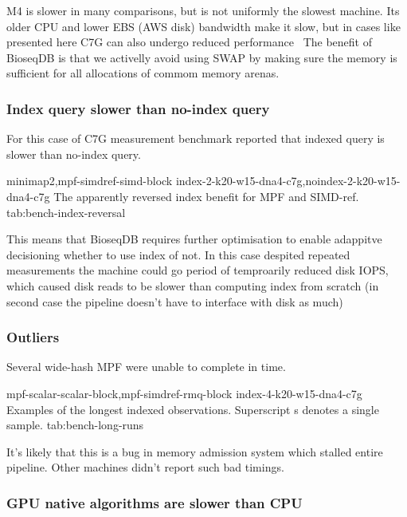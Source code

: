 M4 is slower in many comparisons, but is not uniformly the slowest machine.
Its older CPU and lower EBS (AWS disk) bandwidth make it slow, but in cases like presented here C7G can also undergo reduced performance~\autocite{aws_ebs_limits}
The benefit of BioseqDB is that we activelly avoid using SWAP by making sure the memory is sufficient for all allocations of commom memory arenas.

\subsubsection{Index query slower than no-index query}
\label{sec:bench-index-reversal}

For this case of C7G measurement benchmark reported that indexed query is slower than no-index query.

  {minimap2,mpf-simdref-simd-block}
  {index-2-k20-w15-dna4-c7g,noindex-2-k20-w15-dna4-c7g}
  {The apparently reversed index benefit for MPF and SIMD-ref.}
  {tab:bench-index-reversal}

This means that BioseqDB requires further optimisation to enable adappitve decisioning whether to use index of not. In this case despited repeated measurements the machine could go 
period of temproarily reduced disk IOPS, which caused disk reads to be slower than computing index from scratch (in second case the pipeline doesn't have to interface with disk as much)

\subsubsection{Outliers}
\label{sec:bench-long-runs}

Several wide-hash MPF were unable to complete in time.

  {mpf-scalar-scalar-block,mpf-simdref-rmq-block}
  {index-4-k20-w15-dna4-c7g}
  {Examples of the longest indexed observations. Superscript s denotes a single sample.}
  {tab:bench-long-runs}

It's likely that this is a bug in memory admission system which stalled entire pipeline. Other machines didn't report such bad timings.

\subsubsection{GPU native algorithms are slower than CPU}
\label{sec:bench-gpu-performance}


